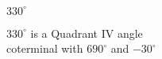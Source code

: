 {$330^{\circ}$}
{$330^{\circ}$ is a Quadrant IV angle\\
coterminal with $690^{\circ}$ and $-30^{\circ}$

\begin{center}
\end{center}}